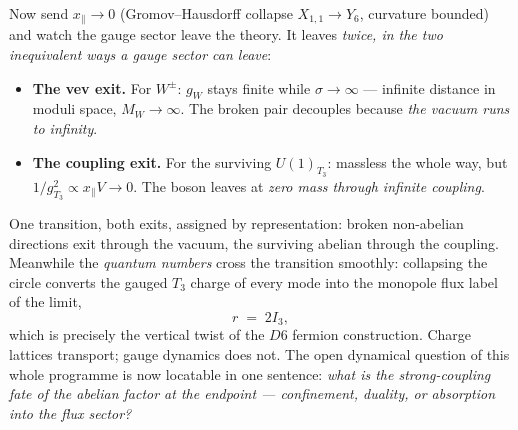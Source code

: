 \documentclass[11pt]{article}
\newcommand{\X}{X_{1,1}}
\begin{document}
Now send $x_\parallel\to0$ (Gromov--Hausdorff collapse $\X\to Y_6$, curvature bounded) and
watch the gauge sector leave the theory. It leaves \emph{twice, in the two inequivalent ways
a gauge sector can leave}:
\begin{itemize}
\item \textbf{The vev exit.} For $W^\pm$: $g_W$ stays finite while
$\sigma\to\infty$ --- infinite distance in moduli space, $M_W\to\infty$. The broken pair
decouples because \emph{the vacuum runs to infinity}.
\item \textbf{The coupling exit.} For the surviving $U(1)_{T_3}$: massless the whole way,
but $1/g_{T_3}^2\propto x_\parallel V\to0$. The boson leaves at \emph{zero mass through
infinite coupling}.
\end{itemize}
One transition, both exits, assigned by representation: broken non-abelian directions exit
through the vacuum, the surviving abelian through the coupling. Meanwhile the \emph{quantum
numbers} cross the transition smoothly: collapsing the circle converts the gauged $T_3$
charge of every mode into the monopole flux label of the limit,
\begin{equation}
r \;=\; 2I_3 ,
\end{equation}
which is precisely the vertical twist of the $D6$ fermion construction. Charge lattices
transport; gauge dynamics does not. The open dynamical question of this whole programme is
now locatable in one sentence: \emph{what is the strong-coupling fate of the abelian factor
at the endpoint --- confinement, duality, or absorption into the flux sector?}
\end{document}
